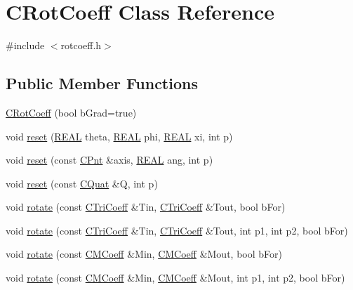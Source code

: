 \hypertarget{classCRotCoeff}{\section{C\-Rot\-Coeff Class Reference}
\label{classCRotCoeff}
}


{\ttfamily \#include $<$rotcoeff.\-h$>$}

\subsection*{Public Member Functions}
\begin{DoxyCompactItemize}
\item 
\hyperlink{classCRotCoeff_a5dae485fb061a3c231365159aefc9bb5}{C\-Rot\-Coeff} (bool b\-Grad=true)
\item 
void \hyperlink{classCRotCoeff_aa52111e9c4cb2949dfae960437742536}{reset} (\hyperlink{util_8h_a5821460e95a0800cf9f24c38915cbbde}{R\-E\-A\-L} theta, \hyperlink{util_8h_a5821460e95a0800cf9f24c38915cbbde}{R\-E\-A\-L} phi, \hyperlink{util_8h_a5821460e95a0800cf9f24c38915cbbde}{R\-E\-A\-L} xi, int p)
\item 
void \hyperlink{classCRotCoeff_a4a6461f2947e6c07d4a28da4d87a8935}{reset} (const \hyperlink{classCPnt}{C\-Pnt} \&axis, \hyperlink{util_8h_a5821460e95a0800cf9f24c38915cbbde}{R\-E\-A\-L} ang, int p)
\item 
void \hyperlink{classCRotCoeff_a6dea4a3900cc4ac8c012cc8790b92719}{reset} (const \hyperlink{classCQuat}{C\-Quat} \&Q, int p)
\item 
void \hyperlink{classCRotCoeff_aa9b14ebaa2c45a8fa740fa36d9f31d2c}{rotate} (const \hyperlink{classCTriCoeff}{C\-Tri\-Coeff} \&Tin, \hyperlink{classCTriCoeff}{C\-Tri\-Coeff} \&Tout, bool b\-For)
\item 
void \hyperlink{classCRotCoeff_a6d65091921f8baa2175c97758dff4e16}{rotate} (const \hyperlink{classCTriCoeff}{C\-Tri\-Coeff} \&Tin, \hyperlink{classCTriCoeff}{C\-Tri\-Coeff} \&Tout, int p1, int p2, bool b\-For)
\item 
void \hyperlink{classCRotCoeff_a319c60548de84e430bd55f17d020fa3f}{rotate} (const \hyperlink{classCMCoeff}{C\-M\-Coeff} \&Min, \hyperlink{classCMCoeff}{C\-M\-Coeff} \&Mout, bool b\-For)
\item 
void \hyperlink{classCRotCoeff_ab93dd694803d34505c026b6d48bb6d25}{rotate} (const \hyperlink{classCMCoeff}{C\-M\-Coeff} \&Min, \hyperlink{classCMCoeff}{C\-M\-Coeff} \&Mout, int p1, int p2, bool b\-For)
\item 

\end{DoxyCompactItemize}
